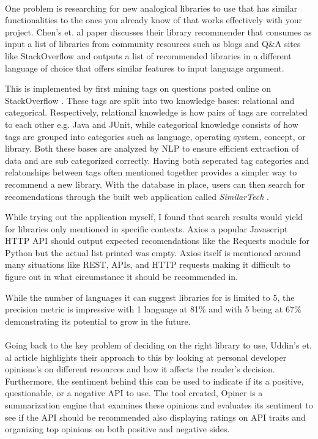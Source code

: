 \documentclass[12pt]{article}
\begin{document}
\paragraph{}
One problem is researching for new analogical libraries to use that has similar functionalities 
to the ones you already know of that works effectively with your project. Chen's et. al \cite{analogical} paper discusses their library recommender 
that consumes as input a list of libraries from community resources such as blogs and Q\&A sites like StackOverflow \cite{stackoverflow} 
and outputs a list of recommended libraries in a different language of choice that offers similar features to input language argument. 

This is implemented by first mining tags on questions posted online on StackOverflow \cite{stackoverflow}.
These tags are split into two knowledge bases: relational and categorical. Respectively, relational knowledge is how pairs of
tags are correlated to each other e.g. Java and JUnit, while categorical knowledge consists of how tags are grouped into categories such as 
language, operating system, concept, or library. Both these bases are analyzed by NLP to ensure efficient extraction of data and are sub categorized correctly.
Having both seperated tag categories and relatonships between tags often mentioned together
provides a simpler way to recommend a new library. With the database in place, users can then search for recomendations through the built
web application called \textit{SimilarTech} \cite{similartech}.

While trying out the application myself, I found that search results would yield for libraries only mentioned in specific contexts.
Axios \cite{axios} a popular Javascript HTTP API should output expected recomendations 
like the Requests \cite{requests} module for Python but the actual list printed was empty.
Axios \cite{axios} itself is mentioned around many situations like REST, APIs, and HTTP requests making it difficult to figure out in what circumstance
it should be recommended in.

While the number of languages it can suggest libraries for is limited to 5, the precision metric is impressive
with 1 language at 81\% and with 5 being at 67\% demonstrating its potential to grow in the future.

\paragraph{}
Going back to the key problem of deciding on the right library to use, Uddin's et. al \cite{opinerarticle} article
highlights their approach to this by looking at personal developer opinions's on different resources
and how it affects the reader's decision. Furthermore, the sentiment behind this can be used to indicate if its 
a positive, questionable, or a negative API to use. The tool created, Opiner \cite{opiner} is a summarization engine
that examines these opinions and evaluates its sentiment to see if the API should be recommended also displaying ratings on API traits
and organizing top opinions on both positive and negative sides. 
\end{document}
